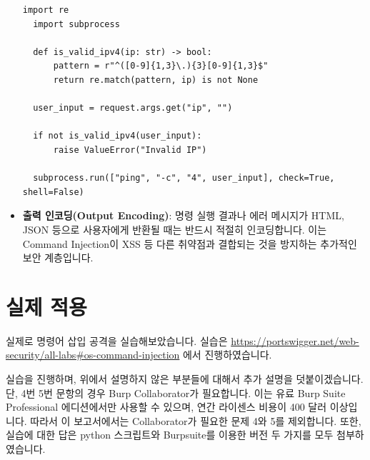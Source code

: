 \documentclass{article}
\begin{document}
\begin{itemize}
  \begin{lstlisting}[caption={Python: subprocess.run 사용 (shell=False). 입력 검증 포함}]
  import re
  import subprocess

  def is_valid_ipv4(ip: str) -> bool:
      pattern = r"^([0-9]{1,3}\.){3}[0-9]{1,3}$"
      return re.match(pattern, ip) is not None

  user_input = request.args.get("ip", "")

  if not is_valid_ipv4(user_input):
      raise ValueError("Invalid IP")

  subprocess.run(["ping", "-c", "4", user_input], check=True, shell=False)
  \end{lstlisting}

  \item \textbf{출력 인코딩(Output Encoding)}:  
  명령 실행 결과나 에러 메시지가 HTML, JSON 등으로 사용자에게 반환될 때는 반드시 적절히 인코딩합니다.  
  이는 Command Injection이 XSS 등 다른 취약점과 결합되는 것을 방지하는 추가적인 보안 계층입니다.
\end{itemize}

\newpage
\section*{실제 적용}
실제로 명령어 삽입 공격을 실습해보았습니다. 실습은 \url{https://portswigger.net/web-security/all-labs#os-command-injection} 에서 진행하였습니다.

실습을 진행하며, 위에서 설명하지 않은 부분들에 대해서 추가 설명을 덧붙이겠습니다.
단, 4번 5번 문항의 경우 Burp Collaborator가 필요합니다. 이는 유료 Burp Suite Professional 에디션에서만 사용할 수 있으며, 연간 라이센스 비용이 400 달러 이상입니다. 
따라서 이 보고서에서는 Collaborator가 필요한 문제 4와 5를 제외합니다.
또한, 실습에 대한 답은 python 스크립트와 Burpsuite를 이용한 버전 두 가지를 모두 첨부하였습니다.
\end{document}
